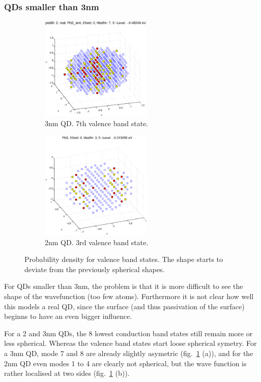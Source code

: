 \subsubsection{QDs smaller than 3nm}	
\begin{figure}
	\centering
	\begin{subfigure}{200px}
		\includegraphics[width=200px]{Fig/Plots/r15VBmod7}
		\caption{3nm QD. 7th valence band state.}
	\end{subfigure}
	\begin{subfigure}{200px}
		\includegraphics[width=200px]{Fig/Plots/r1VBmod3}
		\caption{2nm QD. 3rd valence band state.}
	\end{subfigure}
	\caption{Probability density for valence band states. The shape starts to deviate from the previously spherical shapes.}
	\label{fig:asymWaveFn}
\end{figure}
%
For QDs smaller than 3nm, the problem is that it is more difficult to see the shape of the wavefunction (too few atoms). Furthermore it is not clear how well this models a real QD, since the surface (and thus passivation of the surface) beginns to have an even bigger influence.
	
For a 2 and 3nm QDs, the 8 lowest conduction band states still remain more or less spherical. Whereas the valence band states start loose spherical symetry. For a 3nm QD, mode 7 and 8 are already slightly asymetric (fig.~\ref{fig:asymWaveFn} (a)), and for the 2nm QD even modes 1 to 4 are clearly not spherical, but the wave function is rather localised at two sides (fig.~\ref{fig:asymWaveFn} (b)).
	
